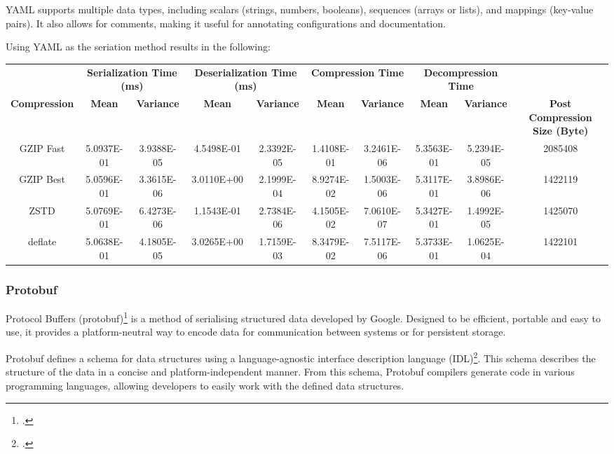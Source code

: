 YAML supports multiple data types, including scalars (strings, numbers, booleans), sequences (arrays or lists), and mappings (key-value pairs). It also allows for comments, making it useful for annotating configurations and documentation.

Using YAML as the seriation method results in the following:

\begin{table}[h]
\centering
\begin{tabular}{cccccccccc}
\hline
 &
  \multicolumn{2}{c}{\textbf{Serialization Time (ms)}} &
  \multicolumn{2}{c}{\textbf{Deserialization Time (ms)}} &
  \multicolumn{2}{c}{\textbf{Compression Time}} &
  \multicolumn{2}{c}{\textbf{Decompression Time}} &
   \\
\textbf{Compression} & \textbf{Mean}     & \textbf{Variance} & \textbf{Mean}     & \textbf{Variance} & \textbf{Mean}     & \textbf{Variance} & \textbf{Mean}     & \textbf{Variance} & \textbf{Post Compression Size (Byte)} \\
\hline
GZIP Fast           & 5.0937E-01 & 3.9388E-05 & 4.5498E-01 & 2.3392E-05 & 1.4108E-01 & 3.2461E-06 & 5.3563E-01 & 5.2394E-05 & 2085408 \\
GZIP Best           & 5.0596E-01 & 3.3615E-06 & 3.0110E+00 & 2.1999E-04 & 8.9274E-02 & 1.5003E-06 & 5.3117E-01 & 3.8986E-06 & 1422119 \\
ZSTD                & 5.0769E-01 & 6.4273E-06 & 1.1543E-01 & 2.7384E-06 & 4.1505E-02 & 7.0610E-07 & 5.3427E-01 & 1.4992E-05 & 1425070 \\
deflate             & 5.0638E-01 & 4.1805E-05 & 3.0265E+00 & 1.7159E-03 & 8.3479E-02 & 7.5117E-06 & 5.3733E-01 & 1.0625E-04 & 1422101 \\
\hline
\end{tabular}
\end{table}

\subsubsection{Protobuf}
Protocol Buffers (protobuf)\footcite{protobuf} is a method of serialising structured data developed by Google. Designed to be efficient, portable and easy to use, it provides a platform-neutral way to encode data for communication between systems or for persistent storage.

Protobuf defines a schema for data structures using a language-agnostic interface description language (IDL)\footcite{idl}. This schema describes the structure of the data in a concise and platform-independent manner. From this schema, Protobuf compilers generate code in various programming languages, allowing developers to easily work with the defined data structures.

